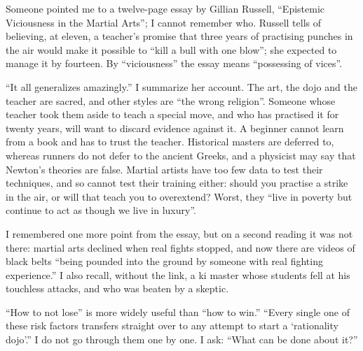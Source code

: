 
Someone pointed me to a twelve-page essay by Gillian Russell, ``Epistemic Viciousness in the Martial Arts''; I cannot remember who. Russell tells of believing, at eleven, a teacher's promise that three years of practising punches in the air would make it possible to ``kill a bull with one blow''; she expected to manage it by fourteen. By ``viciousness'' the essay means ``possessing of vices''.

``It all generalizes amazingly.'' I summarize her account. The art, the dojo and the teacher are sacred, and other styles are ``the wrong religion''. Someone whose teacher took them aside to teach a special move, and who has practised it for twenty years, will want to discard evidence against it. A beginner cannot learn from a book and has to trust the teacher. Historical masters are deferred to, whereas runners do not defer to the ancient Greeks, and a physicist may say that Newton's theories are false. Martial artists have too few data to test their techniques, and so cannot test their training either: should you practise a strike in the air, or will that teach you to overextend? Worst, they ``live in poverty but continue to act as though we live in luxury''. 

I remembered one more point from the essay, but on a second reading it was not there: martial arts declined when real fights stopped, and now there are videos of black belts ``being pounded into the ground by someone with real fighting experience.''  I also recall, without the link, a ki master whose students fell at his touchless attacks, and who was beaten by a skeptic. 

``How to not lose'' is more widely useful than ``how to win.'' ``Every single one of these risk factors transfers straight over to any attempt to start a `rationality dojo'.'' I do not go through them one by one. I ask: ``What can be done about it?'' 
